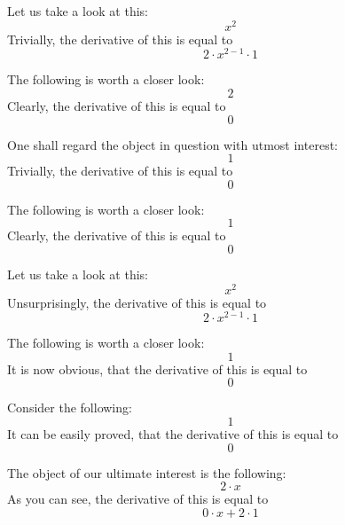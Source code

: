 \documentclass{article}
\begin{document}
Let us take a look at this:
\begin{equation}
x ^{2 } 
\end{equation}
Trivially, the derivative of this is equal to
\begin{equation}
2 \cdot x ^{2 - 1 } \cdot 1 
\end{equation}

The following is worth a closer look:
\begin{equation}
2 
\end{equation}
Clearly, the derivative of this is equal to
\begin{equation}
0 
\end{equation}

One shall regard the object in question with utmost interest:
\begin{equation}
1 
\end{equation}
Trivially, the derivative of this is equal to
\begin{equation}
0 
\end{equation}

The following is worth a closer look:
\begin{equation}
1 
\end{equation}
Clearly, the derivative of this is equal to
\begin{equation}
0 
\end{equation}

Let us take a look at this:
\begin{equation}
x ^{2 } 
\end{equation}
Unsurprisingly, the derivative of this is equal to
\begin{equation}
2 \cdot x ^{2 - 1 } \cdot 1 
\end{equation}

The following is worth a closer look:
\begin{equation}
1 
\end{equation}
It is now obvious, that the derivative of this is equal to
\begin{equation}
0 
\end{equation}

Consider the following:
\begin{equation}
1 
\end{equation}
It can be easily proved, that the derivative of this is equal to
\begin{equation}
0 
\end{equation}

The object of our ultimate interest is the following:
\begin{equation}
2 \cdot x 
\end{equation}
As you can see, the derivative of this is equal to
\begin{equation}
0 \cdot x + 2 \cdot 1 
\end{equation}
\end{document}
